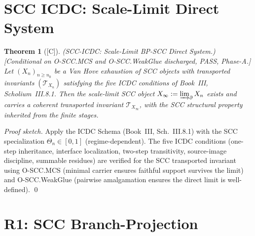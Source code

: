 \documentclass[12pt,oneside]{amsbook}
\theoremstyle{plain}
\newtheorem{theorem}{Theorem}[section]
\theoremstyle{definition}
\theoremstyle{remark}
\newcommand{\status}[1]{\textup{[#1]}}
\begin{document}
\section{SCC ICDC: Scale-Limit Direct System}
\label{sec:icdc}

\begin{theorem}[\status{C}]\label{thm:scc-icdc}
\textup{(SCC-ICDC: Scale-Limit BP-SCC Direct System.)}
\textup{[Conditional on O-SCC.MCS and O-SCC.WeakGlue discharged,
PASS, Phase-A.]}
Let $(X_n)_{n \geq n_0}$ be a Van Hove exhaustion of SCC objects
with transported invariants $(\mathcal{T}_{X_n})$ satisfying the
five ICDC conditions of Book~III, Scholium~III.8.1. Then the
scale-limit SCC object
$X_\infty := \varinjlim_\partial X_n$
exists and carries a coherent transported invariant
$\mathcal{T}_{X_\infty}$, with the SCC structural property
inherited from the finite stages.
\end{theorem}

\begin{proof}[Proof sketch]
Apply the ICDC Schema (Book~III, Sch.~III.8.1) with the SCC
specialization $\Theta_n \in [0,1]$ (regime-dependent). The
five ICDC conditions (one-step inheritance, interface localization,
two-step transitivity, source-image discipline, summable residues)
are verified for the SCC transported invariant using O-SCC.MCS
(minimal carrier ensures faithful support survives the limit) and
O-SCC.WeakGlue (pairwise amalgamation ensures the direct limit
is well-defined).
\qed
\end{proof}

\section{R1: SCC Branch-Projection}
\label{sec:r1}
\end{document}
